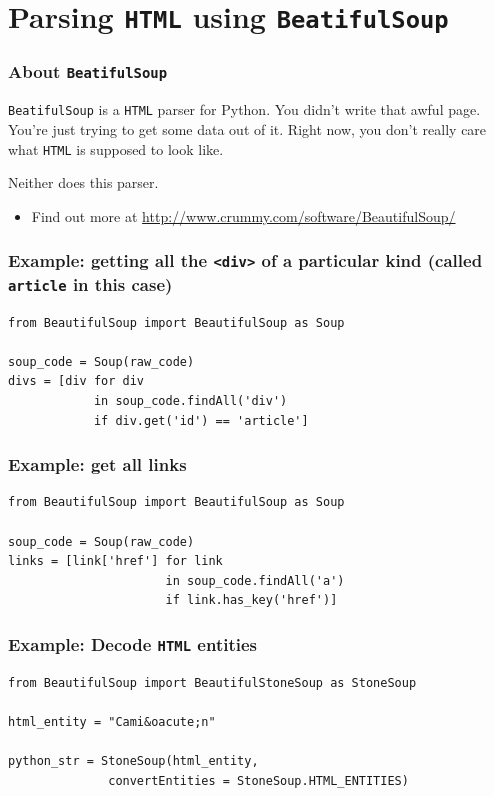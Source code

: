 \documentclass[11pt]{beamer}
\begin{document}
\section{Parsing \texttt{HTML} using \texttt{BeatifulSoup}}
\label{sec-3}
\begin{frame}[fragile]\frametitle{About \texttt{BeatifulSoup}}
\label{sec-3_1}


\texttt{BeatifulSoup} is a \texttt{HTML} parser for Python. You didn't write that
awful page. You're just trying to get some data out of it. Right now,
you don't really care what \texttt{HTML} is supposed to look like.

Neither does this parser.
\begin{itemize}
\item Find out more at \href{http://www.crummy.com/software/BeautifulSoup/}{http://www.crummy.com/software/BeautifulSoup/}
\end{itemize}
\end{frame}
\begin{frame}[fragile]\frametitle{Example: getting all the \texttt{<div>} of a particular kind (called \texttt{article} in this case)}
\label{sec-3_2}


\begin{lstlisting}
from BeautifulSoup import BeautifulSoup as Soup

soup_code = Soup(raw_code)
divs = [div for div 
            in soup_code.findAll('div') 
            if div.get('id') == 'article']
\end{lstlisting}
\end{frame}
\begin{frame}[fragile]\frametitle{Example: get all links}
\label{sec-3_3}



\begin{lstlisting}
from BeautifulSoup import BeautifulSoup as Soup

soup_code = Soup(raw_code)
links = [link['href'] for link 
                      in soup_code.findAll('a') 
                      if link.has_key('href')]
\end{lstlisting}
\end{frame}
\begin{frame}[fragile]\frametitle{Example: Decode \texttt{HTML} entities}
\label{sec-3_4}



\begin{lstlisting}
from BeautifulSoup import BeautifulStoneSoup as StoneSoup

html_entity = "Cami&oacute;n"

python_str = StoneSoup(html_entity,
              convertEntities = StoneSoup.HTML_ENTITIES)
\end{lstlisting}
\end{frame}
\end{document}
